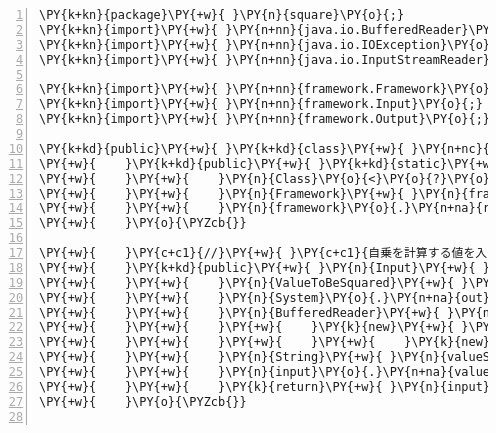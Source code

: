 \begin{Verbatim}[commandchars=\\\{\},numbers=left,firstnumber=1,stepnumber=1,frame=single,fontsize=\small]
\PY{k+kn}{package}\PY{+w}{ }\PY{n}{square}\PY{o}{;}
\PY{k+kn}{import}\PY{+w}{ }\PY{n+nn}{java.io.BufferedReader}\PY{o}{;}
\PY{k+kn}{import}\PY{+w}{ }\PY{n+nn}{java.io.IOException}\PY{o}{;}
\PY{k+kn}{import}\PY{+w}{ }\PY{n+nn}{java.io.InputStreamReader}\PY{o}{;}

\PY{k+kn}{import}\PY{+w}{ }\PY{n+nn}{framework.Framework}\PY{o}{;}
\PY{k+kn}{import}\PY{+w}{ }\PY{n+nn}{framework.Input}\PY{o}{;}
\PY{k+kn}{import}\PY{+w}{ }\PY{n+nn}{framework.Output}\PY{o}{;}

\PY{k+kd}{public}\PY{+w}{ }\PY{k+kd}{class}\PY{+w}{ }\PY{n+nc}{Square}\PY{+w}{ }\PY{k+kd}{extends}\PY{+w}{ }\PY{n}{Framework}\PY{+w}{ }\PY{o}{\PYZob{}}
\PY{+w}{    }\PY{k+kd}{public}\PY{+w}{ }\PY{k+kd}{static}\PY{+w}{ }\PY{k+kt}{void}\PY{+w}{ }\PY{n+nf}{main}\PY{o}{(}\PY{n}{String}\PY{o}{[}\PY{o}{]}\PY{+w}{ }\PY{n}{args}\PY{o}{)}\PY{+w}{ }\PY{k+kd}{throws}\PY{+w}{ }\PY{n}{Exception}\PY{+w}{ }\PY{o}{\PYZob{}}
\PY{+w}{    }\PY{+w}{    }\PY{n}{Class}\PY{o}{<}\PY{o}{?}\PY{o}{>}\PY{+w}{ }\PY{n}{c}\PY{+w}{ }\PY{o}{=}\PY{+w}{ }\PY{n}{Class}\PY{o}{.}\PY{n+na}{forName}\PY{o}{(}\PY{l+s}{"square.Square"}\PY{o}{)}\PY{o}{;}
\PY{+w}{    }\PY{+w}{    }\PY{n}{Framework}\PY{+w}{ }\PY{n}{framework}\PY{+w}{ }\PY{o}{=}\PY{+w}{ }\PY{o}{(}\PY{n}{Framework}\PY{o}{)}\PY{+w}{ }\PY{n}{c}\PY{o}{.}\PY{n+na}{newInstance}\PY{o}{(}\PY{o}{)}\PY{o}{;}
\PY{+w}{    }\PY{+w}{    }\PY{n}{framework}\PY{o}{.}\PY{n+na}{run}\PY{o}{(}\PY{o}{)}\PY{o}{;}
\PY{+w}{    }\PY{o}{\PYZcb{}}

\PY{+w}{    }\PY{c+c1}{//}\PY{+w}{ }\PY{c+c1}{自乗を計算する値を入力する}
\PY{+w}{    }\PY{k+kd}{public}\PY{+w}{ }\PY{n}{Input}\PY{+w}{ }\PY{n+nf}{input}\PY{o}{(}\PY{o}{)}\PY{+w}{ }\PY{k+kd}{throws}\PY{+w}{ }\PY{n}{IOException}\PY{+w}{ }\PY{o}{\PYZob{}}
\PY{+w}{    }\PY{+w}{    }\PY{n}{ValueToBeSquared}\PY{+w}{ }\PY{n}{input}\PY{+w}{ }\PY{o}{=}\PY{+w}{ }\PY{k}{new}\PY{+w}{ }\PY{n}{ValueToBeSquared}\PY{o}{(}\PY{o}{)}\PY{o}{;}
\PY{+w}{    }\PY{+w}{    }\PY{n}{System}\PY{o}{.}\PY{n+na}{out}\PY{o}{.}\PY{n+na}{print}\PY{o}{(}\PY{l+s}{"自乗を計算する値を入力してください："}\PY{o}{)}\PY{o}{;}
\PY{+w}{    }\PY{+w}{    }\PY{n}{BufferedReader}\PY{+w}{ }\PY{n}{reader}\PY{+w}{ }\PY{o}{=}
\PY{+w}{    }\PY{+w}{    }\PY{+w}{    }\PY{k}{new}\PY{+w}{ }\PY{n+nf}{BufferedReader}\PY{o}{(}
\PY{+w}{    }\PY{+w}{    }\PY{+w}{    }\PY{+w}{    }\PY{k}{new}\PY{+w}{ }\PY{n+nf}{InputStreamReader}\PY{o}{(}\PY{n}{System}\PY{o}{.}\PY{n+na}{in}\PY{o}{)}\PY{o}{)}\PY{o}{;}
\PY{+w}{    }\PY{+w}{    }\PY{n}{String}\PY{+w}{ }\PY{n}{valueString}\PY{+w}{ }\PY{o}{=}\PY{+w}{ }\PY{n}{reader}\PY{o}{.}\PY{n+na}{readLine}\PY{o}{(}\PY{o}{)}\PY{o}{;}
\PY{+w}{    }\PY{+w}{    }\PY{n}{input}\PY{o}{.}\PY{n+na}{value}\PY{+w}{ }\PY{o}{=}\PY{+w}{ }\PY{n}{Double}\PY{o}{.}\PY{n+na}{parseDouble}\PY{o}{(}\PY{n}{valueString}\PY{o}{)}\PY{o}{;}
\PY{+w}{    }\PY{+w}{    }\PY{k}{return}\PY{+w}{ }\PY{n}{input}\PY{o}{;}
\PY{+w}{    }\PY{o}{\PYZcb{}}


\end{Verbatim}
